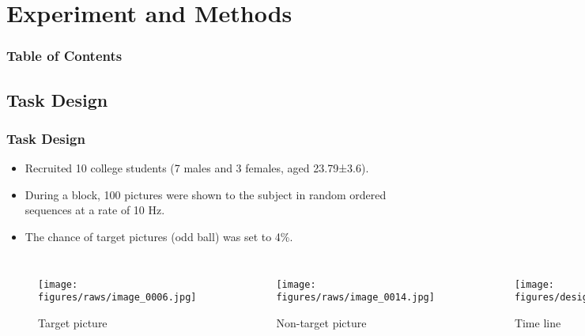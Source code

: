\documentclass[aspectratio=169]{beamer}
\begin{document}
\section{Experiment and Methods}
\begin{frame}[plain]
    \frametitle{Table of Contents}
\end{frame}

\subsection{Task Design}
\begin{frame}
    \frametitle{Task Design}
    \begin{itemize}
        \item Recruited 10 college students (7 males and 3 females, aged 23.79±3.6).
        \item During a block, 100 pictures were shown to the subject in random ordered sequences at a rate of 10 Hz.
        \item The chance of target pictures (odd ball) was set to 4\%.
    \end{itemize}

    \begin{columns}
        \begin{figure}[h]
            \centering
            \texttt{[image: figures/raws/image\_0006.jpg]}
            \caption{Target picture}
        \end{figure}

        \begin{figure}[h]
            \centering
            \texttt{[image: figures/raws/image\_0014.jpg]}
            \caption{Non-target picture}
        \end{figure}

        \begin{figure}[h]
            \centering
            \texttt{[image: figures/design.png]}
            \caption{Time line}
        \end{figure}

    \end{columns}
\end{frame}
\end{document}
